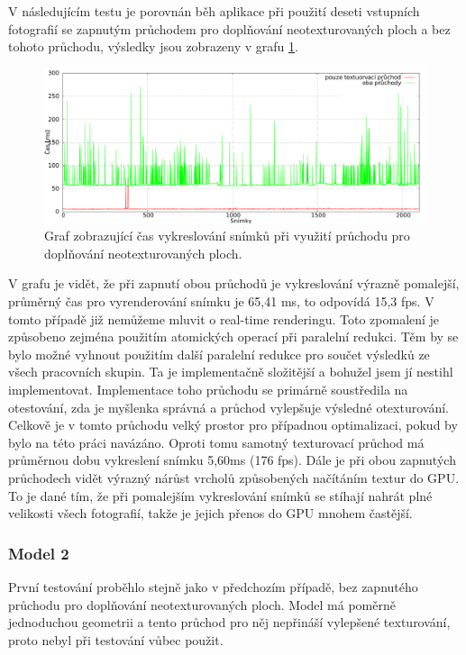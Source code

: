 \documentclass[11pt,twoside,a4paper]{book}
\begin{document}
V následujícím testu je porovnán běh aplikace při použití deseti vstupních fotografií se zapnutým průchodem pro doplňování neotexturovaných ploch a bez tohoto průchodu, výsledky jsou zobrazeny v grafu \ref{fig:data-3}.  

\begin{figure}[hb]
\begin{center}
\includegraphics[width=\textwidth]{figures/data-3}
\caption{Graf zobrazující čas vykreslování snímků při využití průchodu pro doplňování neotexturovaných ploch.}
\label{fig:data-3}
\end{center}
\end{figure}

V grafu je vidět, že při zapnutí obou průchodů je vykreslování výrazně pomalejší, průměrný čas pro vyrenderování snímku je 65,41 ms, to odpovídá 15,3 fps. V tomto případě již nemůžeme mluvit o real-time renderingu. Toto zpomalení je způsobeno zejména použitím atomických operací při paralelní redukci. Těm by se bylo možné vyhnout použitím další paralelní redukce pro součet výsledků ze všech pracovních skupin. Ta je implementačně složitější a bohužel jsem jí nestihl implementovat. Implementace toho průchodu se primárně soustředila na otestování, zda je myšlenka správná a průchod vylepšuje výsledné otexturování. Celkově je v tomto průchodu velký prostor pro případnou optimalizaci, pokud by bylo na této práci navázáno.  Oproti tomu samotný texturovací průchod má průměrnou dobu vykreslení snímku 5,60ms (176 fps). Dále je při obou zapnutých  průchodech vidět výrazný nárůst vrcholů způsobených načítáním textur do GPU. To je dané tím, že při pomalejším vykreslování snímků se stíhají nahrát plné velikosti všech fotografií, takže je jejich přenos do GPU mnohem častější.

\subsubsection*{Model 2}

První testování proběhlo stejně jako v předchozím případě, bez zapnutého průchodu pro doplňování neotexturovaných ploch. Model má poměrně jednoduchou geometrii a tento průchod pro něj nepřináší vylepšené texturování, proto nebyl při testování vůbec použit. 
\end{document}
